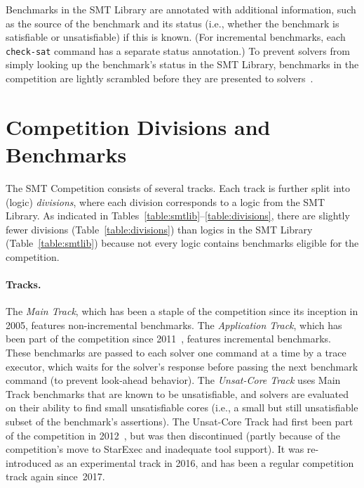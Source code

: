 \documentclass[dvipsnames,table,twoside,11pt]{article}
\newcommand{\maintrack}{Main Track\xspace}
\newcommand{\apptrack}{Application Track\xspace}
\newcommand{\ucoretrack}{Unsat-Core Track\xspace}
\begin{document}
Benchmarks in the SMT Library are annotated with additional
information, such as the source of the benchmark and its status (i.e.,
whether the benchmark is satisfiable or unsatisfiable) if this is
known.  (For incremental benchmarks, each {\tt check-sat} command has
a separate status annotation.)  To prevent solvers from simply looking
up the benchmark's status in the SMT Library, benchmarks in the
competition are lightly scrambled before they are presented to
solvers~\cite{DBLP:conf/cade/Weber16}.


\section{Competition Divisions and Benchmarks}
\label{sec:benchmarks}

The SMT Competition consists of several tracks.  Each track is further split
into (logic) \emph{divisions}, where each division corresponds to a logic from
the SMT Library.  As indicated in
Tables~\ref{table:smtlib}--\ref{table:divisions}, there are slightly fewer
divisions (Table~\ref{table:divisions}) than logics in the SMT Library
(Table~\ref{table:smtlib}) because not every logic contains benchmarks eligible
for the competition.

\paragraph{Tracks.}
The \emph{\maintrack}, which
has been a staple of the competition since its
inception in 2005, features non-incremental benchmarks.  The
\emph{\apptrack}, which has been part of the competition since
2011~\cite{BDdMOS13}, features incremental benchmarks.  These
benchmarks are passed to each solver one command at a time by a trace
executor, which waits for the solver's response before passing the
next benchmark command (to prevent look-ahead behavior).  The
\emph{\ucoretrack} uses \maintrack benchmarks that are known to
be unsatisfiable, and solvers are evaluated on their ability to find
small unsatisfiable cores (i.e., a small but still unsatisfiable
subset of the benchmark's assertions).  The \ucoretrack had first
been part of the competition in 2012~\cite{CGBD12}, but was then
discontinued (partly because of the competition's move to StarExec and
inadequate tool support).  It was re-introduced as an experimental track
in 2016, and has been a regular competition track again since~2017.
\end{document}

